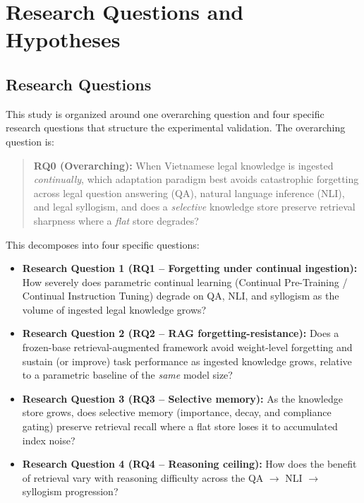 \section{Research Questions and Hypotheses}

\subsection{Research Questions}
This study is organized around one overarching question and four specific research questions that structure the experimental validation. The overarching question is:

\begin{quote}
\textbf{RQ0 (Overarching):} When Vietnamese legal knowledge is ingested \emph{continually}, which adaptation paradigm best avoids catastrophic forgetting across legal question answering (QA), natural language inference (NLI), and legal syllogism, and does a \emph{selective} knowledge store preserve retrieval sharpness where a \emph{flat} store degrades?
\end{quote}

This decomposes into four specific questions:
\begin{itemize}
    \item \textbf{Research Question 1 (RQ1 -- Forgetting under continual ingestion):} How severely does parametric continual learning (Continual Pre-Training / Continual Instruction Tuning) degrade on QA, NLI, and syllogism as the volume of ingested legal knowledge grows?
    \item \textbf{Research Question 2 (RQ2 -- RAG forgetting-resistance):} Does a frozen-base retrieval-augmented framework avoid weight-level forgetting and sustain (or improve) task performance as ingested knowledge grows, relative to a parametric baseline of the \emph{same} model size?
    \item \textbf{Research Question 3 (RQ3 -- Selective memory):} As the knowledge store grows, does selective memory (importance, decay, and compliance gating) preserve retrieval recall where a flat store loses it to accumulated index noise?
    \item \textbf{Research Question 4 (RQ4 -- Reasoning ceiling):} How does the benefit of retrieval vary with reasoning difficulty across the QA $\rightarrow$ NLI $\rightarrow$ syllogism progression?
\end{itemize}

